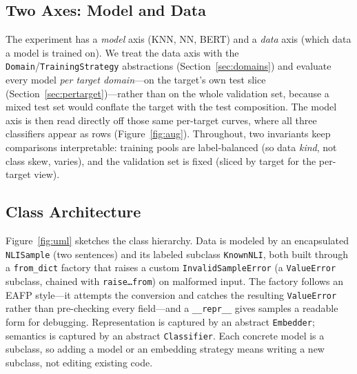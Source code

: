 \documentclass[conference]{IEEEtran}
\begin{document}
\subsection{Two Axes: Model and Data}
The experiment has a \emph{model} axis (KNN, NN, BERT) and a \emph{data}
axis (which data a model is trained on). We treat the data axis with the
\texttt{Domain}/\texttt{TrainingStrategy} abstractions
(Section~\ref{sec:domains}) and evaluate every model \emph{per target
domain}---on the target's own test slice
(Section~\ref{sec:pertarget})---rather than on the whole validation set,
because a mixed test set would conflate the target with the test
composition. The model axis is then read directly off those same
per-target curves, where all three classifiers appear as rows
(Figure~\ref{fig:aug}). Throughout, two invariants keep comparisons
interpretable: training pools are label-balanced (so data \emph{kind}, not
class skew, varies), and the validation set is fixed (sliced by target for
the per-target view).

\subsection{Class Architecture}
Figure~\ref{fig:uml} sketches the class hierarchy. Data is modeled by an
encapsulated \texttt{NLISample} (two sentences) and its labeled subclass
\texttt{KnownNLI}, both built through a \texttt{from\_dict} factory that
raises a custom \texttt{InvalidSampleError} (a \texttt{ValueError}
subclass, chained with \texttt{raise\ldots from}) on malformed input.
The factory follows an EAFP style---it attempts the conversion and
catches the resulting \texttt{ValueError} rather than pre-checking every
field---and a \texttt{\_\_repr\_\_} gives samples a readable form for
debugging.
Representation is captured by an abstract \texttt{Embedder}; semantics
is captured by an abstract \texttt{Classifier}. Each concrete model is a
subclass, so adding a model or an embedding strategy means writing a new
subclass, not editing existing code.
\end{document}

